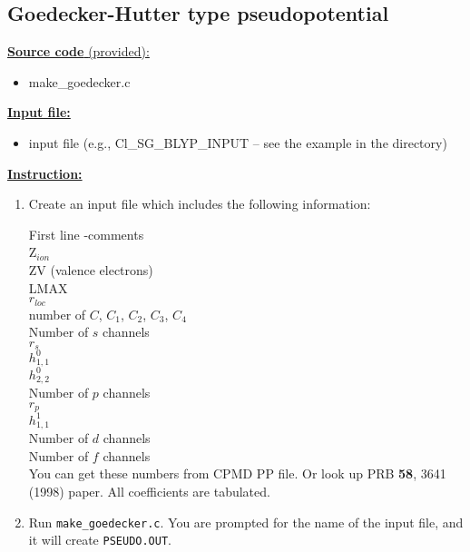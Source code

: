 \subsection{Goedecker-Hutter type pseudopotential}

\noindent
\underline{ {\bf Source code }(provided): }
	\begin{itemize}
	\item make\_goedecker.c
	\end{itemize}

\vskip 12pt
\noindent
\underline{ {\bf Input file:} }
	\begin{itemize}
	\item input file (e.g., Cl\_SG\_BLYP\_INPUT -- see the example in the directory)
	\end{itemize}
	
	
\vskip 12pt
\noindent
\underline{ {\bf Instruction:} }

\begin{enumerate}
\item Create an input file which includes the following information:

First line -comments\\
Z$_{ion}$\\
ZV (valence electrons)\\
LMAX\\
$r_{loc}$\\
number of $C$, $C_1$, $C_2$, $C_3$, $C_4$\\
Number of $s$ channels\\
$r_s$\\
$h^0_{1,1}$\\
$h^0_{2,2}$\\
Number of $p$ channels\\
$r_p$\\
$h^1_{1,1}$\\
Number of $d$ channels\\
Number of $f$ channels\\

You can get these numbers from CPMD PP file. Or look up PRB \textbf{58}, 3641 (1998) paper. All coefficients are tabulated.

\item Run \verb+make_goedecker.c+. You are prompted for the name of the input file, and it will create \verb+PSEUDO.OUT+.


\end{enumerate}




%
